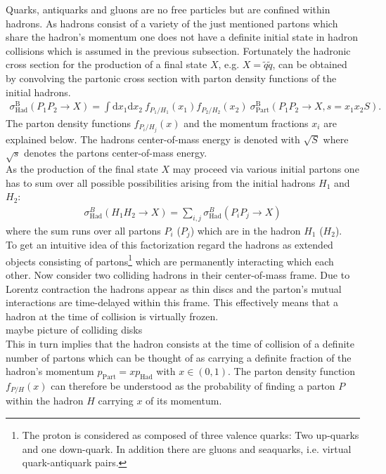 Quarks, antiquarks and gluons are no free particles but are confined within hadrons. As hadrons consist of a variety of the just mentioned partons which share the hadron's momentum one does not have a definite initial state in hadron collisions which is assumed in the previous subsection. Fortunately the hadronic cross section for the production of a final state $X$, e.g. $X = \tilde{q} \tilde{q}$, can be obtained by convolving the partonic cross section with parton density functions of the initial hadrons.
\begin{align}
\sigma^\mathrm{B}_{\mathrm{Had}}(P_1 P_2 \to X) = \int \mbox{d}x_1 \mbox{d}x_2\ f_{P_1/H_1}(x_1) f_{P_2/H_2}(x_2)\ \sigma^\mathrm{B}_{\mathrm{Part}} (P_1 P_2 \to X, s = x_ 1x_2 S).
\end{align}
The parton density functions $f_{P_i/H_j}(x)$ and the momentum fractions $x_i$ are explained below. The hadrons center-of-mass energy is denoted with $\sqrt{S}$ where $\sqrt{s}$ denotes the partons center-of-mass energy.\\
As the production of the final state $X$ may proceed via various initial partons one has to sum over all possible possibilities arising from the initial hadrons $H_1$ and $H_2$:
\begin{align}
\sigma^B_{\mathrm{Had}}(H_1 H_2 \to X) = \sum_{i,j} \sigma^B_{\mathrm{Had}}(P_i P_j \to X)
\end{align}
where the sum runs over all partons $P_i$ ($P_j$) which are in the hadron $H_1$ ($H_2$).\\
To get an intuitive idea of this factorization regard the hadrons as extended objects consisting of partons\footnote{The proton is considered as composed of three valence quarks: Two up-quarks and one down-quark. In addition there are gluons and seaquarks, i.e. virtual quark-antiquark pairs.} which are permanently interacting which each other. Now consider two colliding hadrons in their center-of-mass frame. Due to Lorentz contraction the hadrons appear as thin discs and the parton's mutual interactions are time-delayed within this frame. This effectively means that a hadron at the time of collision is virtually frozen.\\
maybe picture of colliding disks\\
This in turn implies that the hadron consists at the time of collision of a definite number of partons which can be thought of as carrying a definite fraction of the hadron's  momentum $p_{\mathrm{Part}} = x p_{\mathrm{Had}}$ with $x \in \left(0, 1 \right)$. The parton density function $f_{P/H}(x)$ can therefore be understood as the probability of finding a parton $P$ within the hadron $H$ carrying $x$ of its momentum. 
